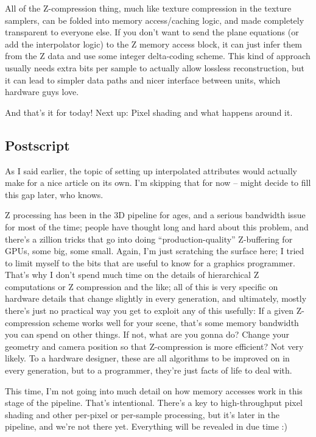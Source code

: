 \documentclass[12pt]{article}
\begin{document}
All of the Z-compression thing, much like texture compression in the texture samplers, can be folded into memory access/caching logic, and made completely transparent to everyone else. If you don’t want to send the plane equations (or add the interpolator logic) to the Z memory access block, it can just infer them from the Z data and use some integer delta-coding scheme. This kind of approach usually needs extra bits per sample to actually allow lossless reconstruction, but it can lead to simpler data paths and nicer interface between units, which hardware guys love.

And that’s it for today! Next up: Pixel shading and what happens around it.

\subsection{Postscript}
\label{sec:org4123ea7}

As I said earlier, the topic of setting up interpolated attributes would actually make for a nice article on its own. I’m skipping that for now – might decide to fill this gap later, who knows.

Z processing has been in the 3D pipeline for ages, and a serious bandwidth issue for most of the time; people have thought long and hard about this problem, and there’s a zillion tricks that go into doing “production-quality” Z-buffering for GPUs, some big, some small. Again, I’m just scratching the surface here; I tried to limit myself to the bits that are useful to know for a graphics programmer. That’s why I don’t spend much time on the details of hierarchical Z computations or Z compression and the like; all of this is very specific on hardware details that change slightly in every generation, and ultimately, mostly there’s just no practical way you get to exploit any of this usefully: If a given Z-compression scheme works well for your scene, that’s some memory bandwidth you can spend on other things. If not, what are you gonna do? Change your geometry and camera position so that Z-compression is more efficient? Not very likely. To a hardware designer, these are all algorithms to be improved on in every generation, but to a programmer, they’re just facts of life to deal with.

This time, I’m not going into much detail on how memory accesses work in this stage of the pipeline. That’s intentional. There’s a key to high-throughput pixel shading and other per-pixel or per-sample processing, but it’s later in the pipeline, and we’re not there yet. Everything will be revealed in due time :)
\end{document}
